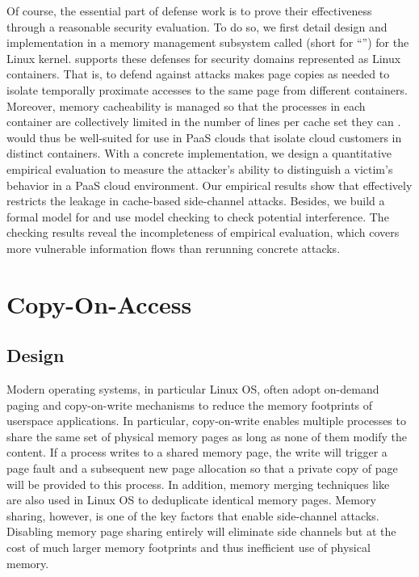 Of course, the essential part of defense work is to prove their
effectiveness through a reasonable security evaluation. To do so, we
first detail design and implementation in a memory management
subsystem called \cachebar (short for ``\cachebarLong'') for the Linux
kernel.  \cachebar supports these defenses for security domains
represented as Linux containers.  That is, \coa to defend against
\flushreload attacks makes page copies as needed to isolate temporally
proximate accesses to the same page from different containers.
Moreover, memory cacheability is managed so that the processes in each
container are collectively limited in the number of lines per cache
set they can \Probe. \cachebar would thus be well-suited for use in
\gls{PaaS} clouds that isolate cloud customers in distinct containers.
With a concrete implementation, we design a quantitative empirical
evaluation to measure the attacker's ability to distinguish a victim's
behavior in a \gls{PaaS} cloud environment. Our empirical results show
that \cachebar effectively restricts the leakage in cache-based
side-channel attacks. Besides, we build a formal model for \coa and
use model checking to check potential interference. The checking
results reveal the incompleteness of empirical evaluation, which
covers more vulnerable information flows than rerunning concrete
attacks. 

\section{Copy-On-Access}
\label{cachebar:sec:coa}
\subsection{Design}
\label{cachebar:sec:coa:design}

Modern operating systems, in particular Linux \gls{OS}, often adopt
on-demand paging and copy-on-write mechanisms to
reduce the memory footprints of userspace applications. In particular,
copy-on-write enables multiple processes to share the same set of
physical memory pages as long as none of them modify the content.  If
a process writes to a shared memory page, the write will trigger a
page fault and a subsequent new page allocation so that a private copy
of page will be provided to this process. In addition, memory merging
techniques like \KSM~\cite{arcangeli2009increasing} are also used in
Linux \gls{OS} to deduplicate identical memory pages.  Memory sharing,
however, is one of the key factors that enable \flushreload
side-channel attacks.  Disabling memory page sharing entirely will
eliminate \flushreload side channels but at the cost of much larger
memory footprints and thus inefficient use of physical memory.

